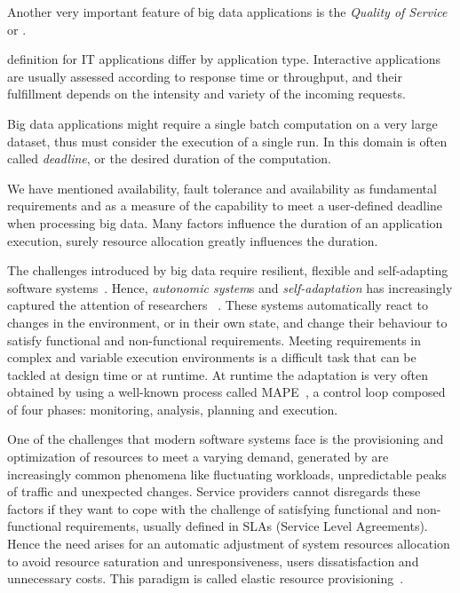 Another very important feature of big data applications is the \textit{Quality of Service} or \qos.

\qos definition for IT applications differ by application type. Interactive applications are usually assessed according to response time or throughput, and their fulfillment depends on the intensity and variety of the incoming requests. 

Big data applications might require a single batch computation on a very large dataset, thus \qos must consider the execution of a single run. In this domain \qos is often called \textit{deadline}, or the desired duration of the computation. 

We have mentioned availability, fault tolerance and availability as fundamental requirements and \qos as a measure of the capability to meet a user-defined deadline when processing big data. Many factors influence the duration of an application execution, surely resource allocation greatly influences the duration. 

The challenges introduced by big data require resilient, flexible and self-adapting software systems~\cite{DeLemos2013}. Hence, \textit{autonomic system}s and \textit{self-adaptation} has increasingly captured the attention of researchers ~\cite{Weyns:2012:CSE:2666795.2666811}. These systems automatically react to changes in the environment, or in their own state, and change their behaviour to satisfy functional and non-functional requirements. Meeting requirements in complex and variable execution environments is a difficult task that can be tackled at design time or at runtime. At runtime the adaptation is very often obtained by using a well-known process called MAPE~\cite{MAPE}, a control loop composed of four phases: monitoring, analysis, planning and execution.

One of the challenges that modern software systems face is the provisioning and optimization of resources to meet a varying demand, generated by are increasingly common phenomena like fluctuating workloads, unpredictable peaks of traffic and unexpected changes. Service providers cannot disregards these factors if they want to cope with the challenge of satisfying functional and non-functional requirements, usually defined in SLAs (Service Level Agreements). Hence the need arises for an automatic adjustment of system resources allocation to avoid resource saturation and unresponsiveness, users dissatisfaction and unnecessary costs. This paradigm is called elastic resource provisioning~\cite{Dustdar2011, Zhang2010, Sehgal2012, Herbst2013}.

